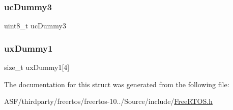 \subsubsection{\texorpdfstring{ucDummy3}{ucDummy3}}
{\footnotesize\ttfamily uint8\+\_\+t uc\+Dummy3}

\mbox{\label{structx_s_t_a_t_i_c___s_t_r_e_a_m___b_u_f_f_e_r_ab6fc664a4122a009b76b08d097efa964}} 
\subsubsection{\texorpdfstring{uxDummy1}{uxDummy1}}
{\footnotesize\ttfamily size\+\_\+t ux\+Dummy1\mbox{[}4\mbox{]}}



The documentation for this struct was generated from the following file\+:\begin{DoxyCompactItemize}
\item 
A\+S\+F/thirdparty/freertos/freertos-\/10../\+Source/include/\mbox{\hyperlink{_free_r_t_o_s_8h}{Free\+R\+T\+O\+S.\+h}}\end{DoxyCompactItemize}
